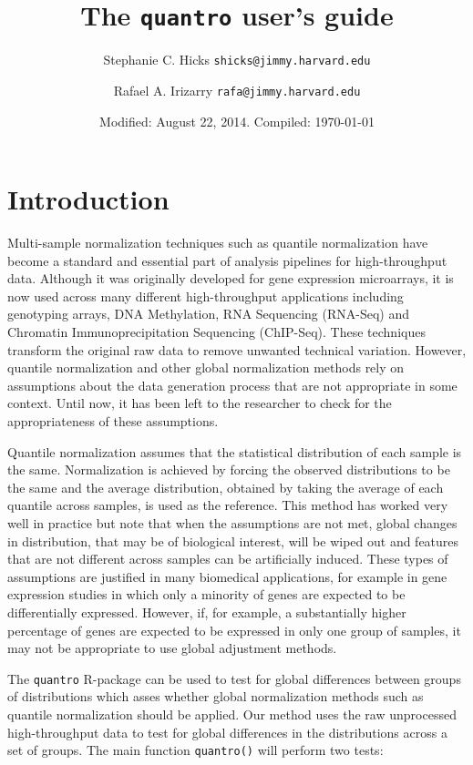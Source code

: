 \documentclass{article}\usepackage[]{graphicx}\usepackage[usenames,dvipsnames]{color}
\title{The \texttt{quantro} user's guide}
\author{Stephanie C. Hicks \texttt{shicks@jimmy.harvard.edu} \and
Rafael A. Irizarry \texttt{rafa@jimmy.harvard.edu} }
\date{Modified: August 22, 2014.  Compiled: \today}
\begin{document}
\maketitle
 
\tableofcontents

\section{Introduction}

Multi-sample normalization techniques such as quantile normalization 
\cite{Bolstad2003, Irizarry2003} have become a standard and essential part of 
analysis pipelines for high-throughput data. Although it was originally 
developed for gene expression microarrays, it is now used across many 
different high-throughput applications including genotyping arrays, DNA 
Methylation, RNA Sequencing (RNA-Seq) and Chromatin Immunoprecipitation 
Sequencing (ChIP-Seq). These techniques transform the original raw data to 
remove unwanted technical variation. However, quantile normalization and other 
global normalization methods rely on assumptions about the data generation 
process that are not appropriate in some context. Until now, it has been left 
to the researcher to check for the appropriateness of these assumptions. 

Quantile normalization assumes that the statistical distribution of each 
sample is the same. Normalization is achieved by forcing the observed 
distributions to be the same and the average distribution, obtained by taking 
the average of each quantile across samples, is used as the reference. This 
method has worked very well in practice but note that when the assumptions are 
not met, global changes in distribution, that may be of biological interest, 
will be wiped out and features that are not different across samples can be 
artificially induced.  These types of assumptions are justified in many 
biomedical applications, for example in gene expression studies in which only 
a minority of genes are expected to be differentially expressed. However, if, 
for example, a substantially higher percentage of genes are expected to be 
expressed in only one group of samples, it may not be appropriate to use 
global adjustment methods. 

The \texttt{quantro} R-package can be used to test for global differences 
between groups of distributions which asses whether global normalization 
methods such as quantile normalization should be applied. Our method uses 
the raw unprocessed high-throughput data to test for global differences in 
the distributions across a set of groups. The main function \texttt{quantro()} 
will perform two tests: 
\end{document}
